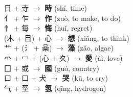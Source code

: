 \documentclass[border=6pt,varwidth]{standalone}
\begin{document}
日 + 寺 $\rightarrow$ \textbf{時} {\small(shí, time)}\\
亻 + 乍 $\rightarrow$ \textbf{作} {\small(zuò, to make, to do)}\\
忄 + 每 $\rightarrow$ \textbf{悔} {\small(huǐ, regret)}\\
(木 + 目) + 心 $\rightarrow$ \textbf{想} {\small(xiǎng, to think)}\\
艹 + (氵 + 喿) $\rightarrow$ \textbf{藻} {\small(zǎo, algae)}\\
爫 + 冖 + (心 + 夊) $\rightarrow$ \textbf{愛} {\small(ài, love)}\\
囗 + 或 $\rightarrow$ \textbf{國} {\small(guó, country)}\\
口 + 口 + 犬 $\rightarrow$ \textbf{哭} {\small(kū, to cry)}\\
气 + 巠 $\rightarrow$ \textbf{氢} {\small(qīng, hydrogen)}
\end{document}
